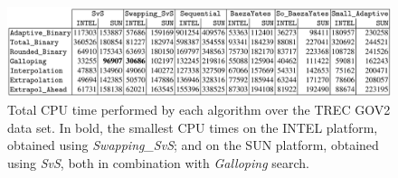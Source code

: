 \begin{figure}[h] 
    \begin{center}
        \includegraphics[width=.8\textwidth]{imgs/barbay_table7.png}
        \caption{Total CPU time performed by each algorithm over the TREC GOV2 data set. In bold, the smallest CPU times on the INTEL
        platform, obtained using \textit{Swapping\_SvS}; and on the SUN platform, obtained using \textit{SvS}, both in combination with \textit{Galloping}
        search. \citep{barbay_ortiz} \label{fig:barbay3}}
    \end{center}
\end{figure}